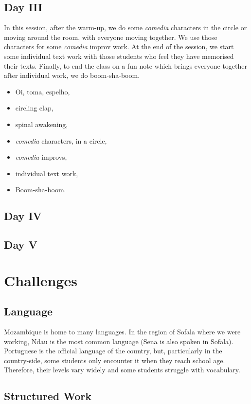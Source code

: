 \documentclass[article,twoside]{memoir}
\begin{document}
\section{Day III}
In this session, after the warm-up, we do some \textit{comedia} characters in
the circle or moving around the room, with everyone moving together. We use
those characters for some \textit{comedia} improv work. At the end of the
session, we start some individual text work with those students who feel they
have memorised their texts. Finally, to end the class on a fun note which
brings everyone together after individual work, we do boom-sha-boom.

\begin{itemize}
\item Oi, toma, espelho,
\item circling clap,
\item spinal awakening,
\item \textit{comedia} characters, in a circle,
\item \textit{comedia} improvs,
\item individual text work,
\item Boom-sha-boom.
\end{itemize}
\section{Day IV}
\section{Day V}

\chapter{Challenges}
\section{Language}

Mozambique is home to many languages. In the region of Sofala where we were
working, Ndau is the most common language (Sena is also spoken in Sofala).
Portuguese is the official language of the country, but, particularly in the
country-side, some students only encounter it when they reach school age.
Therefore, their levels vary widely and some students struggle with vocabulary.

\section{Structured Work}
\end{document}
